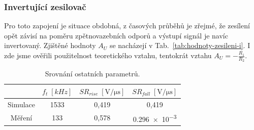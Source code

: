 \documentclass{protokol}
\begin{document}
\subsubsection{Invertující zesilovač}
Pro toto zapojení je situace obdobná, z časových průběhů je zřejmé, že zesílení opět závisí na poměru zpětnovazebních odporů a výstupí signál je navíc invertovaný. Zjištěné hodnoty $ A_U $ se nacházejí v Tab.~\ref{tab:hodnoty-zesileni-i}. I zde jsme ověřili použitelnost teoretického vztahu, tentokrát vztahu $ A_U=-\frac{R_1}{R_2} $.

\begin{table}[h!]
	\centering
	\def\arraystretch{1.4}
	\centering
	\begin{tabular}{|c|c|c|c|}	
		\hline
		& $f_t \; [\unit{kHz}]$ & $SR_{rise} \; [\unit{\volt\per\micro\second}]$ & $SR_{fall} \; [\unit{\volt\per\micro\second}]$  \\ [0.1ex]
		\hline
		Simulace  & \num{1533} & 0,419 & 0,419 \\[0.1ex]
		\hline
		Měření    & 133 & 0,578 & \num{0,296e-3} \\[0.1ex]
		\hline
	\end{tabular}
	\caption{Srovnání ostatních parametrů.}
	\label{tab:porovnani-ostatni}
\end{table}
\end{document}
